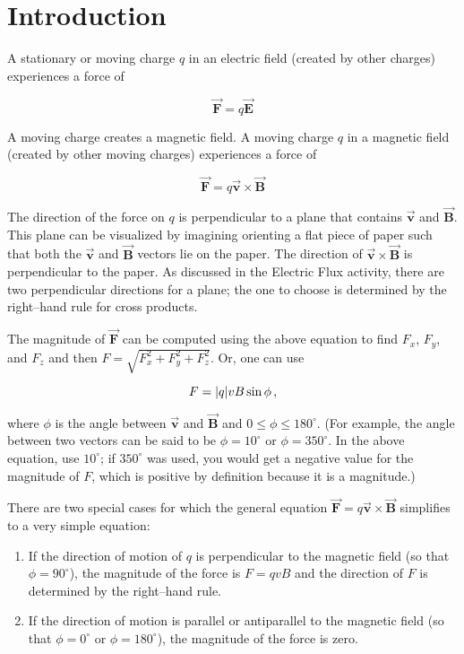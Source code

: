 \documentclass{article}
\newcommand{\bfvec}[1]{\vec{\mathbf{#1}}}
\begin{document}
\section{Introduction}

A stationary or moving charge $q$ in an electric field (created by other charges) experiences a force of

$$\bfvec{F} = q\bfvec{E}$$

A moving charge creates a magnetic field. A moving charge $q$ in a magnetic field (created by other moving charges) experiences a force of

$$\bfvec{F} = q\bfvec{v}\times\bfvec{B}$$

The direction of the force on $q$ is perpendicular to a plane that contains $\bfvec{v}$ and $\bfvec{B}$. This plane can be visualized by imagining orienting a flat piece of paper such that both the  $\bfvec{v}$ and $\bfvec{B}$ vectors lie on the paper. The direction of $\bfvec{v}\times\bfvec{B}$ is perpendicular to the paper. As discussed in the Electric Flux activity, there are two perpendicular directions for a plane; the one to choose is determined by the right--hand rule for cross products.

The magnitude of $\bfvec{F}$ can be computed using the above equation to find $F_x$, $F_y$, and $F_z$ and then $F=\sqrt{F_x^2+F_y^2+F_z^2}$. Or, one can use

$$F = |q|vB\sin\phi\thinspace,$$

where $\phi$ is the angle between $\bfvec{v}$ and $\bfvec{B}$ and $0 \le\phi \le 180^{\circ}$. (For example, the angle between two vectors can be said to be $\phi=10^{\circ}$ or $\phi=350^{\circ}$. In the above equation, use $10^{\circ}$; if $350^{\circ}$ was used, you would get a negative value for the magnitude of $F$, which is positive by definition because it is a magnitude.)

There are two special cases for which the general equation $\bfvec{F} = q\bfvec{v}\times\bfvec{B}$ simplifies to a very simple equation:

\begin{enumerate}

  \item If the direction of motion of $q$ is perpendicular to the magnetic field (so that $\phi = 90^{\circ}$), the magnitude of the force is $F = qvB$ and the direction of $F$ is determined by the right--hand rule.

  \item If the direction of motion is parallel or antiparallel to the magnetic field (so that $\phi = 0^{\circ}$ or $\phi = 180^{\circ}$), the magnitude of the force is zero.

\end{enumerate}
\end{document}
